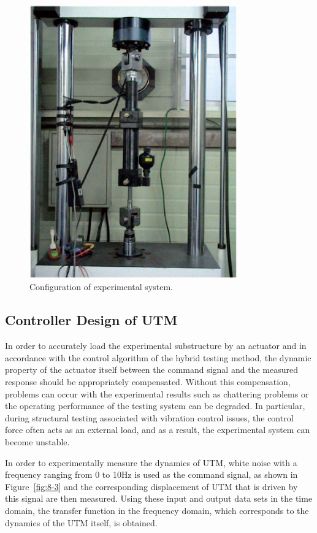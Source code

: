 \begin{figure}[!ht]
\centering
\includegraphics[width=0.8\textwidth] {figure/8-2.eps}
\caption{Configuration of experimental system.}
\label{fig:8-2}
\end{figure}


\subsection{Controller Design of UTM}
In order to accurately load the experimental substructure by an actuator and in accordance with the control algorithm of the hybrid testing method, the dynamic property of the actuator itself between the command signal and the measured response should be appropriately compensated. Without this compensation, problems can occur with the experimental results such as chattering problems or the operating performance of the testing system can be degraded. In particular, during structural testing associated with vibration control issues, the control force often acts as an external load, and as a result, the experimental system can become unstable.

In order to experimentally measure the dynamics of UTM, white noise with a frequency ranging from 0 to 10Hz is used as the command signal, as shown in Figure~\ref{fig:8-3} and the corresponding displacement of UTM that is driven by this signal are then measured. Using these input and output data sets in the time domain, the transfer function in the frequency domain, which corresponds to the dynamics of the UTM itself, is obtained.

